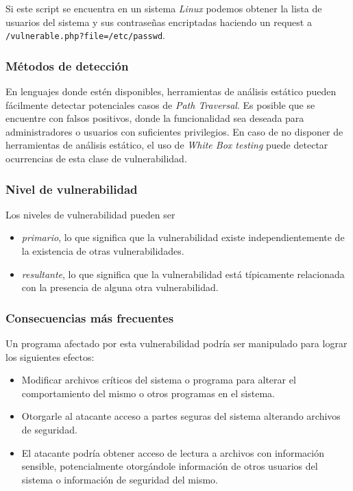 Si este script se encuentra en un sistema \textit{Linux} podemos obtener la lista de usuarios del sistema y sus contraseñas encriptadas haciendo un request a \\
\texttt{/vulnerable.php?file=/etc/passwd}.

\subsubsection{Métodos de detección}

En lenguajes donde estén disponibles, herramientas de análisis estático pueden fácilmente detectar potenciales casos de \textit{Path Traversal}. Es posible que se encuentre con falsos positivos, donde la funcionalidad sea deseada para administradores o usuarios con suficientes privilegios.
En caso de no disponer de herramientas de análisis estático, el uso de \textit{White Box testing} puede detectar ocurrencias de esta clase de vulnerabilidad.

\subsubsection{Nivel de vulnerabilidad}

Los niveles de vulnerabilidad pueden ser

\begin{itemize}
    \item \textit{primario}, lo que significa que la vulnerabilidad existe independientemente de la existencia de otras vulnerabilidades.
    \item \textit{resultante}, lo que significa que la vulnerabilidad está típicamente relacionada con la presencia de alguna otra vulnerabilidad.
\end{itemize}


\subsubsection{Consecuencias más frecuentes}

Un programa afectado por esta vulnerabilidad podría ser manipulado para lograr los siguientes efectos:

\begin{itemize}

    \item Modificar archivos críticos del sistema o programa para alterar el comportamiento del mismo o otros programas en el sistema.

    \item Otorgarle al atacante acceso a partes seguras del sistema alterando archivos de seguridad.

    \item El atacante podría obtener acceso de lectura a archivos con información sensible, potencialmente otorgándole información de otros usuarios del sistema o información de seguridad del mismo.

\end{itemize}


